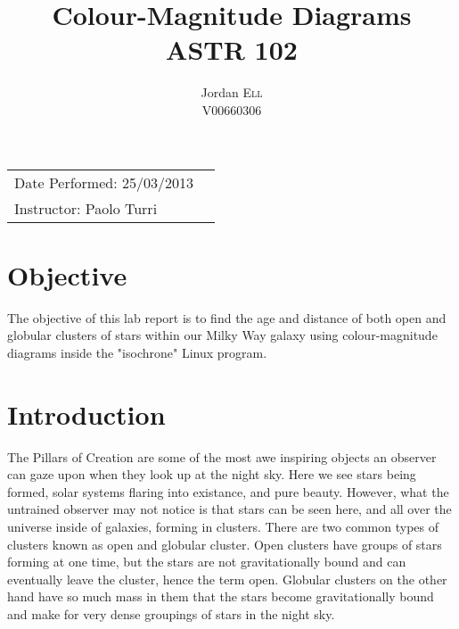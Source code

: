 \documentclass{article}
\title{Colour-Magnitude Diagrams \\ ASTR 102} %
\author{Jordan \textsc{Ell} \\ V00660306} %
\begin{document}
\maketitle %

\begin{tabular}{lr}
Date Performed: 25/03/2013\\ %
Instructor: Paolo Turri %
\end{tabular}

\setlength\parindent{0pt} %

\renewcommand{\labelenumi}{\alph{enumi}.} %


\section{Objective}

The objective of this lab report is to find the age and distance of both open
and globular clusters of stars within our Milky Way galaxy using colour-magnitude
diagrams inside the "isochrone" Linux program.
 

\section{Introduction}

The Pillars of Creation are some of the most awe inspiring objects an observer can
gaze upon when they look up at the night sky. Here we see stars being formed, solar systems
flaring into existance, and pure beauty. However, what the untrained observer may not
notice is that stars can be seen here, and all over the universe inside of galaxies,
forming in clusters. There are two common types of clusters known as open and globular
cluster. Open clusters have groups of stars forming at one time, but the stars are not
gravitationally bound and can eventually leave the cluster, hence the term open. Globular
clusters on the other hand have so much mass in them that the stars become gravitationally
bound and make for very dense groupings of stars in the night sky.\\
\end{document}
